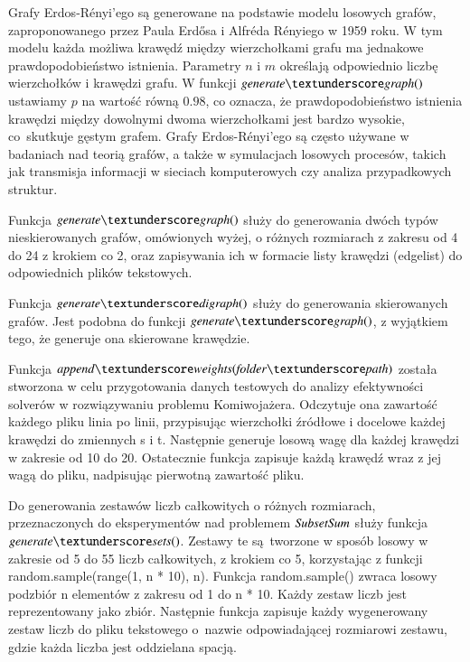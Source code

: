 Grafy Erdos-Rényi'ego są generowane na podstawie modelu losowych grafów, zaproponowanego przez Paula Erdősa i Alfréda Rényiego w 1959 roku.
W tym modelu każda możliwa krawędź między wierzchołkami grafu ma jednakowe prawdopodobieństwo istnienia.
Parametry $n$ i $m$ określają odpowiednio liczbę wierzchołków i krawędzi grafu. W funkcji $\generategraph$ ustawiamy $p$ na wartość równą $0.98$, co oznacza, że prawdopodobieństwo istnienia krawędzi między dowolnymi dwoma wierzchołkami jest bardzo wysokie, co~skutkuje gęstym grafem.
Grafy Erdos-Rényi'ego są często używane w badaniach nad teorią grafów, a także w symulacjach losowych procesów, takich jak transmisja informacji w sieciach komputerowych czy analiza przypadkowych struktur.

Funkcja $\generategraph$ służy do generowania dwóch typów nieskierowanych grafów, omówionych wyżej, o różnych rozmiarach z zakresu od 4 do 24 z krokiem co 2, oraz zapisywania ich w formacie listy krawędzi (edgelist) do odpowiednich plików tekstowych. 



Funkcja $\generatedigraph$ służy do generowania skierowanych grafów. Jest podobna do funkcji $\generategraph$, z wyjątkiem tego, że generuje ona skierowane krawędzie. 



Funkcja $\appendweights$ została stworzona w celu przygotowania danych testowych do analizy efektywności solverów w rozwiązywaniu problemu Komiwojażera. Odczytuje ona zawartość każdego pliku linia po linii, przypisując wierzchołki źródłowe i docelowe każdej krawędzi do zmiennych s i t. Następnie generuje losową wagę dla każdej krawędzi w zakresie od 10 do 20. Ostatecznie funkcja zapisuje każdą krawędź wraz z jej wagą do pliku, nadpisując pierwotną zawartość pliku.



Do generowania zestawów liczb całkowitych o różnych rozmiarach, przeznaczonych do eksperymentów nad problemem ${\mathit{SubsetSum}}$ służy funkcja $\generatesets$. Zestawy te są~tworzone w sposób losowy w zakresie od 5 do 55 liczb całkowitych, z krokiem co 5, korzystając z funkcji random.sample(range(1, n * 10), n). Funkcja random.sample() zwraca losowy podzbiór n elementów z zakresu od 1 do n * 10. Każdy zestaw liczb jest reprezentowany jako zbiór. Następnie funkcja zapisuje każdy wygenerowany zestaw liczb do pliku tekstowego o~nazwie odpowiadającej rozmiarowi zestawu, gdzie każda liczba jest oddzielana spacją.

